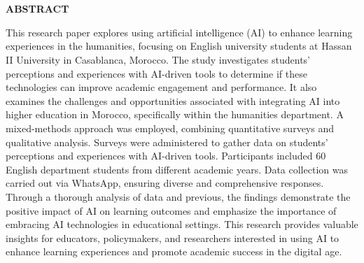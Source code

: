 
\newenvironment{myabstract}
{%
    \thispagestyle{empty}%
    \vspace*{\stretch{2}}%
    \justifying      %
}
{\par %
    \vspace{\stretch{3}} %
    \clearpage           %
}

\chapter*{}
\begin{myabstract}
    \begin{center}
        {\textbf{ABSTRACT}}
    \end{center}
    This research paper explores using artificial intelligence (AI) to
    enhance learning experiences in the humanities, focusing on English
    university students at Hassan II University in Casablanca, Morocco.
    The study investigates students’ perceptions and experiences with
    AI-driven tools to determine if these technologies can improve
    academic engagement and performance. It also examines the
    challenges and opportunities associated with integrating
    AI into higher education in Morocco, specifically within
    the humanities department. A mixed-methods approach was
    employed, combining quantitative surveys and qualitative
    analysis. Surveys were administered to gather data on students’
    perceptions and experiences with AI-driven tools. Participants
    included 60 English department students from different academic
    years. Data collection was carried out via WhatsApp, ensuring
    diverse and comprehensive responses. Through a thorough analysis
    of data and previous, the findings demonstrate the positive impact
    of AI on learning outcomes and emphasize the importance of embracing
    AI technologies in educational settings. This research provides
    valuable insights for educators, policymakers, and researchers
    interested in using AI to enhance learning experiences and
    promote academic success in the digital age.
\end{myabstract}
